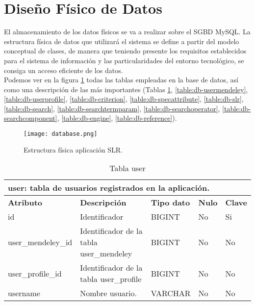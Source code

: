 \section{Diseño Físico de Datos}
El almacenamiento de los datos físicos se va a realizar sobre el SGBD MySQL. La estructura física de datos que utilizará el sistema se define a partir del modelo conceptual de clases, de manera que teniendo presente los requisitos establecidos para el sistema de información y las particularidades del entorno tecnológico, se consiga un acceso eficiente de los datos.\\
Podemos ver en la figura \ref{fig:database} todas las tablas empleadas en la base de datos, así como una descripción de las más importantes (Tablas \ref{table:db-user}, \ref{table:db-usermendeley}, \ref{table:db-userprofile}, \ref{table:db-criterion}, \ref{table:db-specattribute}, \ref{table:db-slr}, \ref{table:db-search}, \ref{table:db-searchtermparam}, \ref{table:db-searchoperator}, \ref{table:db-searchcomponent}, \ref{table:db-engine}, \ref{table:db-reference}).

\begin{figure}[!hpt]
	\begin{center} 
		\texttt{[image: database.png]}
		\caption{Estructura física aplicación SLR.}
		\label{fig:database}
	\end{center}
\end{figure}

\begin{table}[!hbt]
	\begin{center}
		\begin{tabular}{|p{3cm}|p{4cm}|p{4cm}|p{2cm}|p{2cm}|}
			\hline
			\multicolumn{5}{|l|}{\textbf{user:} tabla de usuarios registrados en la aplicación.} \\
			\hline
			\hline
			\textbf{Atributo} & \textbf{Descripción} & \textbf{Tipo dato} & \textbf{Nulo} & \textbf{Clave}\\
			\hline
			id & Identificador  & BIGINT & No & Si\\
			\hline
			user\_mendeley\_id & Identificador de la tabla user\_mendeley  & BIGINT & No & No\\
			\hline
			user\_profile\_id & Identificador de la tabla user\_profile  & BIGINT & No & No\\
			\hline
			username & Nombre usuario.  & VARCHAR & No & No\\
			\hline
		\end{tabular}
		\caption{Tabla user}
		\label{table:db-user}
	\end{center}
\end{table}

